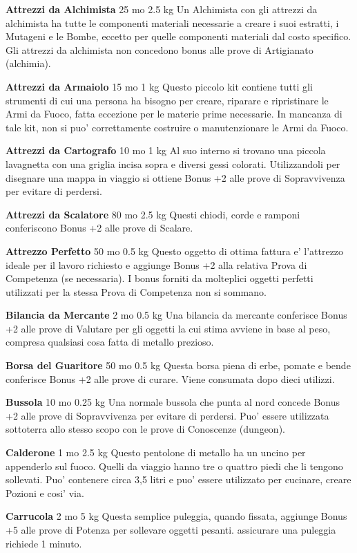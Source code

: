 \documentclass[a4paper,11pt,twoside,openany]{book}
\begin{document}
{\textbf{Attrezzi da Alchimista} 25 mo 2.5 kg Un Alchimista con gli attrezzi da alchimista ha tutte le componenti materiali necessarie a creare i suoi estratti, i Mutageni e le Bombe, eccetto per quelle componenti materiali dal costo specifico. Gli attrezzi da alchimista non concedono bonus alle prove di Artigianato (alchimia).

\textbf{Attrezzi da Armaiolo} 15 mo 1 kg Questo piccolo kit contiene tutti gli strumenti di cui una persona ha bisogno per creare, riparare e ripristinare le Armi da Fuoco, fatta eccezione per le materie prime necessarie. In mancanza di tale kit, non si puo' correttamente costruire o manutenzionare le Armi da Fuoco.

\textbf{Attrezzi da Cartografo} 10 mo 1 kg Al suo interno si trovano una piccola lavagnetta con una griglia incisa sopra e diversi gessi colorati. Utilizzandoli per disegnare una mappa in viaggio si ottiene Bonus +2 alle prove di Sopravvivenza per evitare di perdersi.

\textbf{Attrezzi da Scalatore} 80 mo 2.5 kg Questi chiodi, corde e ramponi conferiscono Bonus +2 alle prove di Scalare.

\textbf{Attrezzo Perfetto} 50 mo 0.5 kg Questo oggetto di ottima fattura e' l'attrezzo ideale per il lavoro richiesto e aggiunge Bonus +2 alla relativa Prova di Competenza (se necessaria). I bonus forniti da molteplici oggetti perfetti utilizzati per la stessa Prova di Competenza non si sommano.

\textbf{Bilancia da Mercante} 2 mo 0.5 kg Una bilancia da mercante conferisce Bonus +2 alle prove di Valutare per gli oggetti la cui stima avviene in base al peso, compresa qualsiasi cosa fatta di metallo prezioso.

\textbf{Borsa del Guaritore} 50 mo 0.5 kg Questa borsa piena di erbe, pomate e bende conferisce Bonus +2 alle prove di curare. Viene consumata dopo dieci utilizzi.

\textbf{Bussola} 10 mo 0.25 kg Una normale bussola che punta al nord concede Bonus +2 alle prove di Sopravvivenza per evitare di perdersi. Puo' essere utilizzata sottoterra allo stesso scopo con le prove di Conoscenze (dungeon).

\textbf{Calderone} 1 mo 2.5 kg Questo pentolone di metallo ha un uncino per appenderlo sul fuoco. Quelli da viaggio hanno tre o quattro piedi che li tengono sollevati. Puo' contenere circa 3,5 litri e puo' essere utilizzato per cucinare, creare Pozioni e cosi' via.

\textbf{Carrucola} 2 mo 5 kg Questa semplice puleggia, quando fissata, aggiunge Bonus +5 alle prove di Potenza per sollevare oggetti pesanti. assicurare una puleggia richiede 1 minuto.

}
\end{document}
